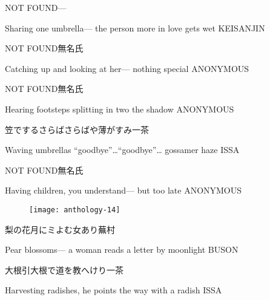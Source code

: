 \begin{haiku}
   NOT FOUND\hfill{---}

    \vin{} Sharing one umbrella---
    \vin{} \vin{} the person more in love
    \vin{} \vin{} \vin{} gets wet \hspace{\fill} KEISANJIN
\end{haiku}

\begin{haiku}
    NOT FOUND\hfill{\FH 無名氏}

    \vin{} Catching up
    \vin{} \vin{} and looking at her---
    \vin{} \vin{} \vin{} nothing special \hspace{\fill} ANONYMOUS
\end{haiku}

\begin{haiku}
    NOT FOUND\hfill{\FH 無名氏}

    \vin{} Hearing footsteps
    \vin{} \vin{} splitting in two
    \vin{} \vin{} \vin{} the shadow \hspace{\fill} ANONYMOUS
\end{haiku}

\begin{haiku}
    {\FH 笠でするさらばさらばや薄がすみ}\hfill{\FH 一茶}

    \vin{} Waving umbrellas
    \vin{} \vin{} ``goodbye''\ldots``goodbye''\ldots
    \vin{} \vin{} \vin{} gossamer haze \hspace{\fill} ISSA
\end{haiku}

\begin{haiku}
    NOT FOUND\hfill{\FH 無名氏}

    \vin{} Having children,
    \vin{} \vin{} you understand---
    \vin{} \vin{} \vin{} but too late \hspace{\fill} ANONYMOUS
\end{haiku}

\begin{figure}
    \texttt{[image: anthology-14]}
\end{figure}

\begin{haiku}
    {\FH 梨の花月にミよむ女あり}\hfill{\FH 蕪村}

    \vin{} Pear blossoms---
    \vin{} \vin{} a woman reads a letter
    \vin{} \vin{} \vin{} by moonlight \hspace{\fill} BUSON
\end{haiku}

\begin{haiku}
    {\FH 大根引大根で道を教へけり}\hfill{\FH 一茶}

    \vin{} Harvesting radishes,
    \vin{} \vin{} he points the way
    \vin{} \vin{} \vin{} with a radish \hspace{\fill} ISSA
\end{haiku}

